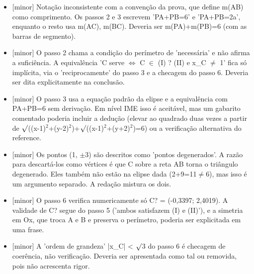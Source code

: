 \documentclass{article}%
\begin{document}
\begin{itemize}%
\item%
{[}minor{]} Notação inconsistente com a convenção da prova, que define m(AB) como comprimento. Os passos 2 e 3 escrevem 'PA+PB=6' e 'PA+PB=2a', enquanto o resto usa m(AC), m(BC). Deveria ser m(PA)+m(PB)=6 (com as barras de segmento).%
\item%
{[}minor{]} O passo 2 chama a condição do perímetro de 'necessária' e não afirma a suficiência. A equivalência 'C serve $\Leftrightarrow$ C $\in$ (I) ? (II) e x\_C $\neq$ 1' fica só implícita, via o 'reciprocamente' do passo 3 e a checagem do passo 6. Deveria ser dita explicitamente na conclusão.%
\item%
{[}minor{]} O passo 3 usa a equação padrão da elipse e a equivalência com PA+PB=6 sem derivação. Em nível IME isso é aceitável, mas um gabarito comentado poderia incluir a dedução (elevar ao quadrado duas vezes a partir de $\surd$((x-1)$^2$+(y-2)$^2$)+$\surd$((x-1)$^2$+(y+2)$^2$)=6) ou a verificação alternativa do reference.%
\item%
{[}minor{]} Os pontos (1, $\pm$3) são descritos como 'pontos degenerados'. A razão para descartá{-}los como vértices é que C sobre a reta AB torna o triângulo degenerado. Eles também não estão na elipse dada (2+9=11$\neq$6), mas isso é um argumento separado. A redação mistura os dois.%
\item%
{[}minor{]} O passo 6 verifica numericamente só C? = (-0,3397; 2,4019). A validade de C? segue do passo 5 ('ambos satisfazem (I) e (II)'), e a simetria em Ox, que troca A e B e preserva o perímetro, poderia ser explicitada em uma frase.%
\item%
{[}minor{]} A 'ordem de grandeza' |x\_C| < $\surd$3 do passo 6 é checagem de coerência, não verificação. Deveria ser apresentada como tal ou removida, pois não acrescenta rigor.%
\end{itemize}%
\end{document}
